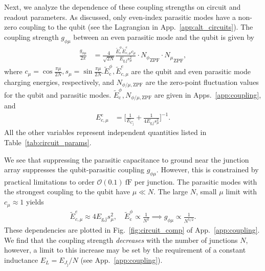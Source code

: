 \documentclass[%
reprint,
superscriptaddress,
 amsmath,amssymb,
 aps,
 prx,
longbibliography,
floatfix,
]{revtex4-2}
\newcommand{\singh}[1]{{\color{orange}{{}#1}}}%
\newcommand{\AC}[1]{{\color{blue}{{}[AC: #1]}}}
\begin{document}
Next, we analyze the dependence of these coupling strengths on circuit and readout parameters. As discussed, only even-index parasitic modes have a non-zero coupling to the qubit (see the Lagrangian in App.~\ref{app:alt_circuits}). The coupling strength $g_{\phi \mu}$ between an even parasitic mode and the qubit is given by
\begin{align}
\frac{g_{\phi\mu}}{2\pi}&=\frac{4}{\sqrt{2N}} \frac{\tilde{E}^\phi_\textrm{c}\tilde{E}^e_{c,\mu}c_\mu}{E_{\textrm{g,j}}s_\mu^2}     \cdot {N_\phi}_{\mathrm{ZPF}} \cdot {N_\mu}_{\mathrm{ZPF}},
\end{align}
where $c_\mu=\cos{\frac{\pi\mu}{2N}},s_\mu = \sin \frac{\pi \mu}{2N}.\tilde{E}_\textrm{c}^\phi,\tilde{E}^e_{c,\mu} $ are the qubit and even parasitic mode charging energies, respectively, and $N_{\phi/\mu,\mathrm{ZPF}}$ are the zero-point fluctuation values for the qubit and parasitic modes. $\tilde{E}_\textrm{c}^\phi,N_{\phi/\mu,\mathrm{ZPF}}$ are given in Apps.~\ref{app:coupling}, and
\begin{align}
E_{c,\mu}^e&=\Big[\frac{1}{E_{C_\textrm{j}}}+\frac{1}{4E_{\textrm{g,j}}s_\mu^2}\Big]^{-1}.\label{eq:parasitic}
\end{align}
All the other variables represent independent quantities listed in Table~\ref{tab:circuit_params}. 

We see that  suppressing the parasitic capacitance to ground near the junction array suppresses the qubit-parasitic coupling $g_{\phi\mu}$. However, this is constrained by practical limitations to order $\mathcal{O}(0.1) \ \mathrm{fF}$  per junction. The parasitic modes with the strongest coupling to the qubit have $\mu\ll N$. The large $N$, small $\mu$ limit with $c_\mu\approx 1$ yields
\begin{align}
    \tilde{E}^e_{c,\mu}\approx 4E_{\textrm{g,j}}s_\mu^2, \quad \tilde{E}^\phi_\textrm{c}\propto \frac{1}{N^2}\implies g_{\phi\mu}\propto \frac{1}{N^{5/2}}.\label{eq:dep1}
\end{align}
These dependencies are plotted in Fig.~\ref{fig:circuit_comp} of App.~\ref{app:coupling}. We find that the coupling strength \textit{decreases} with the number of junctions $N$, however, a limit to this increase may be set by the requirement of a constant inductance $E_L=E_{J_\textrm{j}}/N$ (see App.~\ref{app:coupling}). 
\end{document}

